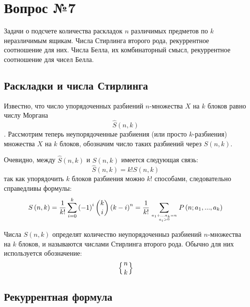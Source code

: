 \chapter{Вопрос №7}

Задачи о подсчете количества раскладок $n$ различимых предметов по $k$ неразличимым ящикам. Числа Стирлинга второго рода, рекуррентное соотношение для них. Числа Белла, их комбинаторный смысл, рекуррентное соотношение для чисел Белла.

\section{Раскладки и числа Стирлинга}

Известно, что число упорядоченных разбиений $n$-множества $X$ на $k$ блоков равно числу Моргана $$ \hat S\left(n,k\right) $$. Рассмотрим теперь неупорядоченные разбиения (или просто $k$-разбиения) множества $X$ на $k$ блоков, обозначим число таких разбиений через $S\left(n,k\right)$.

Очевидно, между $\hat S\left(n,k\right)$ и $S\left(n,k\right)$ имеется следующая связь:
\begin{equation}
	\hat S\left(n,k\right) = k! S\left(n,k\right)
\end{equation}
так как упорядочить $k$ блоков разбиения можно $k!$ способами, следовательно справедливы формулы:
\begin{equation}
	S\left(n,k\right) = \frac{1}{k!} \sum_{i=0}^k \left(-1\right)^{i}\binom{k}{i}\left(k-i\right)^n = \frac{1}{k!}\sum_{{{a_1 + ... a_k = n}\atop{a_i > 0}}} P\left(n; a_1, ..., a_k\right)
\end{equation}

Числа $S\left(n,k\right)$ определят количество неупорядоченныз разбиений $n$-множества на $k$ блоков, и называются числами Стирлинга второго рода. Обычно для них используется обозначение: $$ \left\{{{n}\atop{k}}\right\} $$

\section{Рекуррентная формула}

